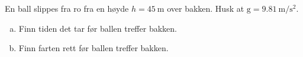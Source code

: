 %
En ball slippes fra ro fra en høyde $h = \SI{45}{\metre}$ over bakken. Husk at $\mathrm{g} = \SI{9.81}{\metre\per\second\squared}$.
\begin{enumerate}[a)]
    \item Finn tiden det tar før ballen treffer bakken.
    \item Finn farten rett før ballen treffer bakken.
\end{enumerate}

